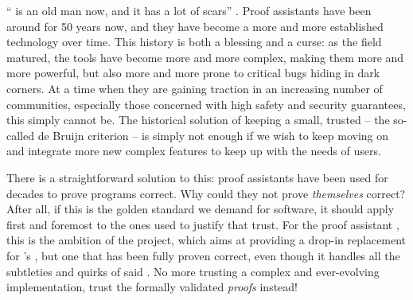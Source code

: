 
\dedication{
}


\maketitle



“ is an old man now, and it has a lot of scars”
\cite[citing Assia Mahboubi]{QuantaPA}.
Proof assistants have been around for 50 years now, and they have become a more and
more established technology over time. This history is both a blessing and a curse: as
the field matured, the tools have become more and more complex, making them more and more
powerful, but also more and more prone to critical bugs hiding in dark corners. At a time
when they are gaining traction in an increasing number of communities,
especially those concerned with high safety and security guarantees, this simply cannot be.
The historical solution of keeping a small, trusted 
– the so-called de Bruijn criterion –
is  simply not enough if we wish to keep moving on and integrate more new complex features
to keep up with the needs of users.

There is a straightforward solution to this:
proof assistants have been used for decades to prove
programs correct. Why could they not prove \emph{themselves} correct? After all, if this is
the golden standard we demand for software, it should apply first and foremost to the ones
used to justify that trust. For the proof assistant ,
this is the ambition of the  project,
which aims at providing a drop-in replacement for ’s , but one that has been
fully proven correct, even though it handles all the subtleties and quirks of said .
No more trusting a complex and ever-evolving implementation, trust the formally validated
\emph{proofs} instead!


